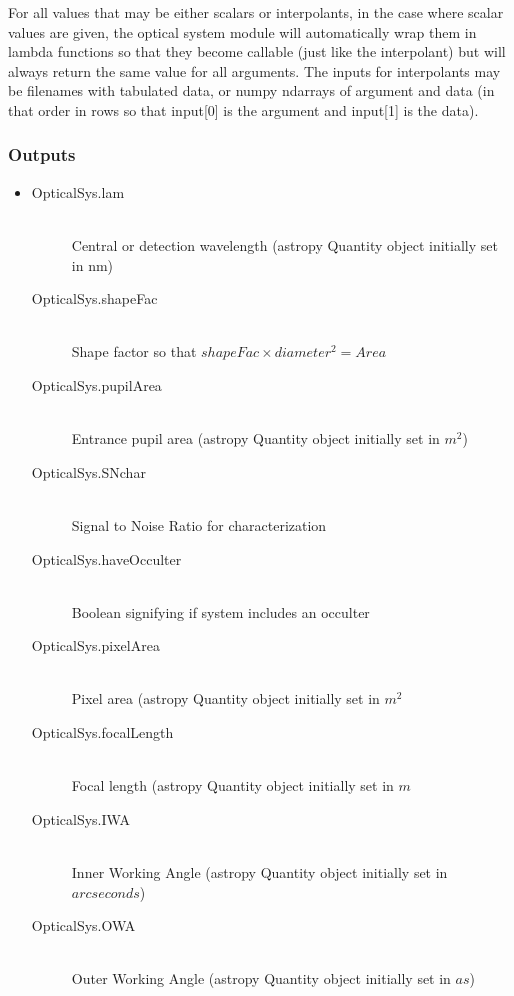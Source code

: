 \documentclass[cleanfoot]{asme2ej}
\begin{document}
For all values that may be either scalars or interpolants, in the case where scalar values are given, the optical system module will automatically wrap them in lambda functions so that they become callable (just like the interpolant) but will always return the same value for all arguments.  The inputs for interpolants may be filenames with tabulated data, or numpy ndarrays of argument and data (in that order in rows so that input[0] is the argument and input[1] is the data).

\subsubsection*{Outputs}
\begin{itemize}
    \item 
    \begin{description}
        \item[OpticalSys.lam] \hfill \\
        Central or detection wavelength (astropy Quantity object initially set in nm)
        \item[OpticalSys.shapeFac] \hfill \\
        Shape factor so that $ shapeFac \times diameter^2 = Area $
        \item[OpticalSys.pupilArea] \hfill \\
        Entrance pupil area (astropy Quantity object initially set in $ m^{2} $)
        \item[OpticalSys.SNchar] \hfill \\
        Signal to Noise Ratio for characterization
        \item[OpticalSys.haveOcculter] \hfill \\
        Boolean signifying if system includes an occulter
        \item[OpticalSys.pixelArea] \hfill \\
        Pixel area (astropy Quantity object initially set in $ m^{2} $
        \item[OpticalSys.focalLength] \hfill \\
        Focal length (astropy Quantity object initially set in $ m $
        \item[OpticalSys.IWA] \hfill \\
        Inner Working Angle (astropy Quantity object initially set in $ arcseconds $)
        \item[OpticalSys.OWA] \hfill \\
        Outer Working Angle (astropy Quantity object initially set in $ as $)

\end{description}
\end{itemize}
\end{document}
